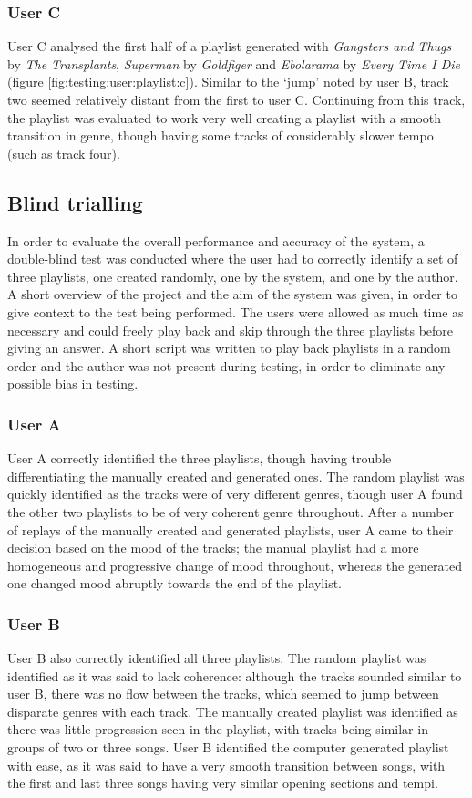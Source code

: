 \subsubsection{User C}
User C analysed the first half of a playlist generated with \emph{Gangsters and Thugs} by \emph{The Transplants}, \emph{Superman} by \emph{Goldfiger} and \emph{Ebolarama} by \emph{Every Time I Die} (figure \ref{fig:testing:user:playlist:c}). Similar to the `jump' noted by user B, track two seemed relatively distant from the first to user C. Continuing from this track, the playlist was evaluated to work very well creating a playlist with a smooth transition in genre, though having some tracks of considerably slower tempo (such as track four).

\subsection{Blind trialling}
In order to evaluate the overall performance and accuracy of the system, a double-blind test was conducted where the user had to correctly identify a set of three playlists, one created randomly, one by the system, and one by the author. A short overview of the project and the aim of the system was given, in order to give context to the test being performed. The users were allowed as much time as necessary and could freely play back and skip through the three playlists before giving an answer. A short script was written to play back playlists in a random order and the author was not present during testing, in order to eliminate any possible bias in testing.
\subsubsection{User A}
User A correctly identified the three playlists, though having trouble differentiating the manually created and generated ones. The random playlist was quickly identified as the tracks were of very different genres, though user A found the other two playlists to be of very coherent genre throughout. After a number of replays of the manually created and generated playlists, user A came to their decision based on the mood of the tracks; the manual playlist had a more homogeneous and progressive change of mood throughout, whereas the generated one changed mood abruptly towards the end of the playlist.
\subsubsection{User B}
User B also correctly identified all three playlists. The random playlist was identified as it was said to lack coherence: although the tracks sounded similar to user B, there was no flow between the tracks, which seemed to jump between disparate genres with each track. The manually created playlist was identified as there was little progression seen in the playlist, with tracks being similar in groups of two or three songs. User B identified the computer generated playlist with ease, as it was said to have a very smooth transition between songs, with the first and last three songs having very similar opening sections and tempi.
